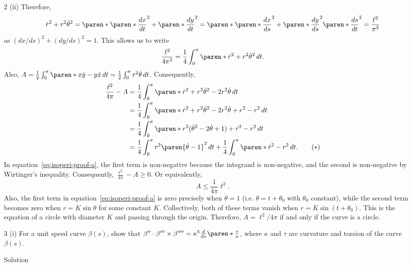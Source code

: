 \documentclass[11pt]{penrose}
\begin{document}
\begin{problem}{2 (ii)}
    Therefore,
    \begin{equation*}
        \dot{r}^2 + r^2 \dot{\theta}^2
        = \paren*{ \paren*{\frac{dx}{dt}}^2 + \paren*{\frac{dy}{dt}}^2 }
        = \paren*{ \paren*{\frac{dx}{ds}}^2 + \paren*{\frac{dy}{ds}}^2 } \paren*{\frac{ds}{dt}}^2
        = \frac{\ell^2}{\pi^2}
    \end{equation*}
    as $(dx/ds)^2 + (dy/ds)^2 = 1$. This allows us to write
    \begin{equation*}
        \frac{\ell^2}{4\pi^2} = \frac{1}{4} \int_0^\pi \paren*{\dot{r}^2 + r^2 \dot{\theta}^2} \,dt.
    \end{equation*}
    Also, $A = \frac{1}{2} \int_0^\pi \paren*{x\dot{y} - y\dot{x}} \,dt = \frac{1}{2} \int_0^\pi r^2 \dot{\theta} \,dt$. Consequently,
    \begin{align*}
        \frac{\ell^2}{4\pi} - A
        &= \frac{1}{4} \int_0^\pi \paren*{\dot{r}^2 + r^2 \dot{\theta}^2 - 2r^2\dot{\theta}} \,dt\\
        &= \frac{1}{4} \int_0^\pi \paren*{\dot{r}^2 + r^2 \dot{\theta}^2 - 2r^2\dot{\theta} + r^2 - r^2} \,dt\\
        &= \frac{1}{4} \int_0^\pi \paren*{r^2 (\dot{\theta}^2 - 2\dot{\theta} + 1) + \dot{r}^2 - r^2} \,dt\\
        &= \frac{1}{4} \int_0^\pi r^2 \paren{\dot{\theta}-1}^2 \,dt + \frac{1}{4}\int_0^\pi \paren*{\dot{r}^2 - r^2} \,dt. \tag{\textasteriskcentered}
        \label{eq:isoperi-proof-a}
    \end{align*}
    In equation~\eqref{eq:isoperi-proof-a}, the first term is non-negative because the integrand is non-negative, and the second is non-negative by Wirtinger's inequality. Consequently, $\frac{\ell^2}{4\pi} - A \geq 0$. Or equivalently,
    \begin{equation*}
        A \leq \frac{1}{4\pi} \ell^2.
    \end{equation*}
    Also, the first term in equation~\eqref{eq:isoperi-proof-a} is zero precisely when $\dot{\theta} = 1$ (i.e. $\theta = t + \theta_0$ with $\theta_0$ constant), while the second term becomes zero when $r = K \sin\theta$ for some constant $K$. Collectively, both of these terms vanish when $r = K \sin(t + \theta_0)$. This is the equation of a circle with diameter $K$ and passing through the origin. Therefore, $A = \ell^2 / 4\pi$ if and only if the curve is a circle.
\end{problem}

\begin{problem}{3 (i)}
    For a unit speed curve $\beta(s)$, show that $\beta'' \cdot \beta''' \times \beta'''' = \kappa^5 \frac{d}{ds}\paren*{\frac{\tau}{\kappa}}$, where $\kappa$ and $\tau$ are curvature and torsion of the curve $\beta(s)$.

    \solution Solution
\end{problem}
\end{document}
